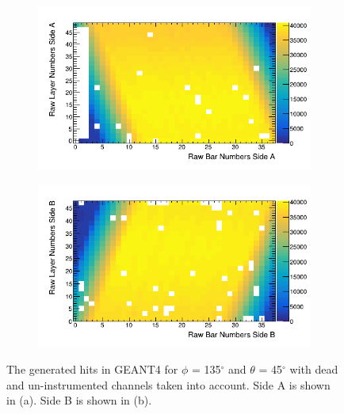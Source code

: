 \begin{figure}[!h]
\centering
\begin{subfigure}{.5\textwidth}
  \centering
  \includegraphics[width=\linewidth]{Chapter5/Figs/cosmicTrackerUncertainties/sideAGen_PVsT_135_45.png}
  \captionsetup{width=.9\linewidth}
  \caption{}
  \label{subFig:sideAGen_PVsT_135_45}
\end{subfigure}%
\begin{subfigure}{.5\textwidth}
  \centering
\includegraphics[width=\linewidth]{Chapter5/Figs/cosmicTrackerUncertainties/sideBGen_PVsT_135_45.png}
  \captionsetup{width=.9\linewidth}
  \caption{}
  \label{subFig:sideBGen_PVsT_135_45}
\end{subfigure}
\caption{The generated hits in GEANT4 for $\phi$ = 135$^\circ$ and $\theta$ = 45$^\circ$ with dead and un-instrumented channels taken into account. Side A is shown in (a). Side B is shown in (b).}
\label{fig:sideABGen_PVsT_135_45}
\end{figure}

